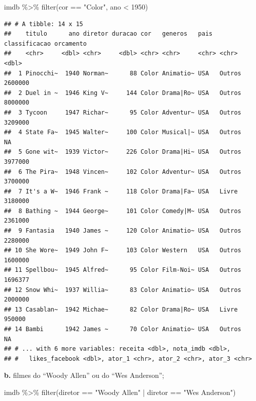 \documentclass[
]{book}
\newenvironment{Shaded}{\begin{snugshade}}{\end{snugshade}}
\newcommand{\DecValTok}[1]{\textcolor[rgb]{0.00,0.00,0.81}{#1}}
\newcommand{\FunctionTok}[1]{\textcolor[rgb]{0.00,0.00,0.00}{#1}}
\newcommand{\NormalTok}[1]{#1}
\newcommand{\SpecialCharTok}[1]{\textcolor[rgb]{0.00,0.00,0.00}{#1}}
\newcommand{\StringTok}[1]{\textcolor[rgb]{0.31,0.60,0.02}{#1}}
\begin{document}
\begin{Shaded}
\begin{Highlighting}[]
\NormalTok{imdb }\SpecialCharTok{\%\textgreater{}\%} 
  \FunctionTok{filter}\NormalTok{(cor }\SpecialCharTok{==} \StringTok{"Color"}\NormalTok{, ano }\SpecialCharTok{\textless{}} \DecValTok{1950}\NormalTok{)}
\end{Highlighting}
\end{Shaded}

\begin{verbatim}
## # A tibble: 14 x 15
##    titulo      ano diretor duracao cor   generos   pais  classificacao orcamento
##    <chr>     <dbl> <chr>     <dbl> <chr> <chr>     <chr> <chr>             <dbl>
##  1 Pinocchi~  1940 Norman~      88 Color Animatio~ USA   Outros          2600000
##  2 Duel in ~  1946 King V~     144 Color Drama|Ro~ USA   Outros          8000000
##  3 Tycoon     1947 Richar~      95 Color Adventur~ USA   Outros          3209000
##  4 State Fa~  1945 Walter~     100 Color Musical|~ USA   Outros               NA
##  5 Gone wit~  1939 Victor~     226 Color Drama|Hi~ USA   Outros          3977000
##  6 The Pira~  1948 Vincen~     102 Color Adventur~ USA   Outros          3700000
##  7 It's a W~  1946 Frank ~     118 Color Drama|Fa~ USA   Livre           3180000
##  8 Bathing ~  1944 George~     101 Color Comedy|M~ USA   Outros          2361000
##  9 Fantasia   1940 James ~     120 Color Animatio~ USA   Outros          2280000
## 10 She Wore~  1949 John F~     103 Color Western   USA   Outros          1600000
## 11 Spellbou~  1945 Alfred~      95 Color Film-Noi~ USA   Outros          1696377
## 12 Snow Whi~  1937 Willia~      83 Color Animatio~ USA   Outros          2000000
## 13 Casablan~  1942 Michae~      82 Color Drama|Ro~ USA   Livre            950000
## 14 Bambi      1942 James ~      70 Color Animatio~ USA   Outros               NA
## # ... with 6 more variables: receita <dbl>, nota_imdb <dbl>,
## #   likes_facebook <dbl>, ator_1 <chr>, ator_2 <chr>, ator_3 <chr>
\end{verbatim}

\textbf{b.} filmes do ``Woody Allen'' ou do ``Wes Anderson'';

\begin{Shaded}
\begin{Highlighting}[]
\NormalTok{imdb }\SpecialCharTok{\%\textgreater{}\%} 
  \FunctionTok{filter}\NormalTok{(diretor }\SpecialCharTok{==} \StringTok{"Woody Allen"} \SpecialCharTok{|}\NormalTok{ diretor }\SpecialCharTok{==} \StringTok{"Wes Anderson"}\NormalTok{)}
\end{Highlighting}
\end{Shaded}
\end{document}
